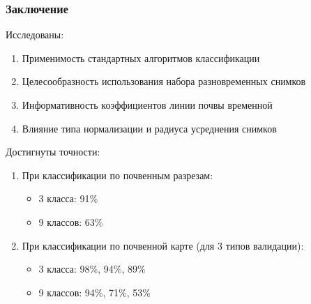 \documentclass{beamer}
\begin{document}
\begin{frame}
\frametitle{Заключение}
\begin{block}{Исследованы:}
\begin{enumerate}
    \item Применимость стандартных алгоритмов классификации
    \item Целесообразность использования набора разновременных снимков 
    \item Информативность коэффициентов линии почвы временной
    \item Влияние типа нормализации и радиуса усреднения снимков 
\end{enumerate}
\end{block}
\begin{block}{Достигнуты точности:}
\begin{enumerate}
    \item При классификации по почвенным разрезам:
    \begin{itemize}
        \item 3 класса: 91\%
        \item 9 классов: 63\%
    \end{itemize}
    \item При классификации по почвенной карте (для 3 типов валидации):
    \begin{itemize}
        \item 3 класса: 98\%, 94\%, 89\%
        \item 9 классов: 94\%, 71\%, 53\%
    \end{itemize}
\end{enumerate}
\end{block}
\end{frame}
\end{document}
